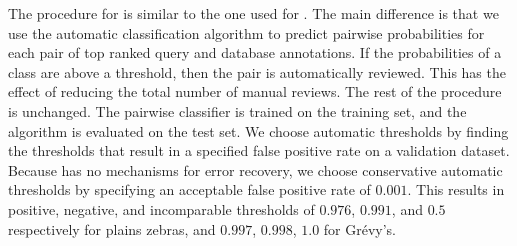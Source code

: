 
    The procedure for  is similar to the one used for .
    The main difference is that we use the automatic classification algorithm to predict pairwise probabilities
      for each pair of top ranked query and database annotations.
    If the probabilities of a class are above a threshold, then the pair is automatically reviewed.
    This has the effect of reducing the total number of manual reviews.
    The rest of the procedure is unchanged.
    The pairwise classifier is trained on the training set, and the algorithm is evaluated on the test set.
    We choose automatic thresholds by finding the thresholds that result in a specified false positive rate on a
      validation dataset.
    Because  has no mechanisms for error recovery, we choose conservative automatic thresholds by
      specifying an acceptable false positive rate of $0.001$.
    This results in positive, negative, and incomparable thresholds of $0.976$, $0.991$, and $0.5$ respectively
      for plains zebras, and $0.997$, $0.998$, $1.0$ for Grévy's.


